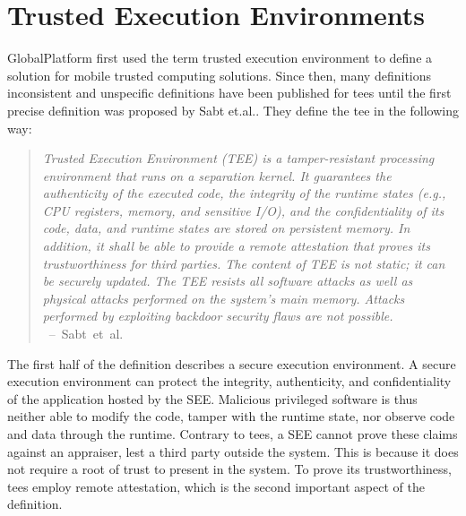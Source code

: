\section{Trusted Execution Environments}
\label{sec:state:tee}
GlobalPlatform first used the term trusted execution environment to define a
solution for mobile trusted computing solutions.\cite{globaltee} Since then,
many definitions inconsistent and unspecific definitions have been published for
\glspl{tee} until the first precise definition was proposed by Sabt
et.al.\cite{sabt2015trusted}. They define the \gls{tee} in the following way:
\begin{quote}
    \textit{Trusted Execution Environment (TEE) is a tamper-resistant processing
        environment that runs on a separation kernel. It guarantees the authenticity of
        the executed code, the integrity of the runtime states (e.g., CPU registers,
        memory, and sensitive I/O), and the confidentiality of its code, data, and
        runtime states are stored on persistent memory. In addition, it shall be able
        to provide a remote attestation that proves its trustworthiness for third
        parties. The content of TEE is not static; it can be securely updated. The TEE
        resists all software attacks as well as physical attacks performed on the
        system's main memory. Attacks performed by exploiting backdoor security flaws
        are not possible. \\
    } \mbox{ -- Sabt et al.\cite{sabt2015trusted}}
\end{quote}

The first half of the definition describes a secure execution environment. A
secure execution environment can protect the integrity, authenticity, and
confidentiality of the application hosted by the SEE. Malicious privileged
software is thus neither able to modify the code, tamper with the runtime state,
nor observe code and data through the runtime. Contrary to \glspl{tee}, a SEE
cannot prove these claims against an appraiser, lest a third party outside the
system. This is because it does not require a root of trust to present in the
system. To prove its trustworthiness, \glspl{tee} employ remote attestation,
which is the second important aspect of the definition.\\

